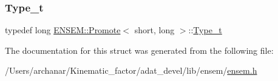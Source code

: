 \subsubsection{\texorpdfstring{Type\_t}{Type\_t}\hspace{0.1cm}{\footnotesize\ttfamily [2/2]}}
{\footnotesize\ttfamily typedef long \mbox{\hyperlink{structENSEM_1_1Promote}{E\+N\+S\+E\+M\+::\+Promote}}$<$ short, long $>$\+::\mbox{\hyperlink{structENSEM_1_1Promote_3_01short_00_01long_01_4_a560571e93323f728261d16b19c7d0df7}{Type\+\_\+t}}}



The documentation for this struct was generated from the following file\+:\begin{DoxyCompactItemize}
\item 
/\+Users/archanar/\+Kinematic\+\_\+factor/adat\+\_\+devel/lib/ensem/\mbox{\hyperlink{lib_2ensem_2ensem_8h}{ensem.\+h}}\end{DoxyCompactItemize}
